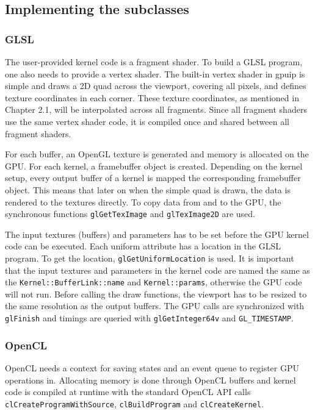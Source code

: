 \subsection{Implementing the subclasses}
\subsubsection{GLSL}
The user-provided kernel code is a fragment shader. To build a GLSL program, one also needs to provide a vertex shader. The built-in vertex shader in gpuip is simple and draws a 2D quad across the viewport, covering all pixels, and defines texture coordinates in each corner. These texture coordinates, as mentioned in Chapter 2.1, will be interpolated across all fragments. Since all fragment shaders use the same vertex shader code, it is compiled once and shared between all fragment shaders.
\newline

For each buffer, an OpenGL texture is generated and memory is allocated on the GPU. For each kernel, a framebuffer object is created. Depending on the kernel setup, every output buffer of a kernel is mapped the corresponding framebuffer object. This means that later on when the simple quad is drawn, the data is rendered to the textures directly. To copy data from and to the GPU, the synchronous functions {\tt glGetTexImage} and {\tt glTexImage2D} are used.
\newline

The input textures (buffers) and parameters has to be set before the GPU kernel code can be executed. Each uniform attribute has a location in the GLSL program. To get the location, {\tt glGetUniformLocation} is used. It is important that the input textures and parameters in the kernel code are named the same as the {\tt Kernel::BufferLink::name} and {\tt Kernel::params}, otherwise the GPU code will not run. Before calling the draw functions, the viewport has to be resized to the same resolution as the output buffers. The GPU calls are synchronized with {\tt glFinish} and timings are queried with {\tt glGetInteger64v} and {\tt GL\_TIMESTAMP}.

\subsubsection{OpenCL}

OpenCL needs a context for saving states and an event queue to register GPU operations in. Allocating memory is done through OpenCL buffers and kernel code is compiled at runtime with the standard OpenCL API calls {\tt clCreateProgramWithSource}, {\tt clBuildProgram} and {\tt clCreateKernel}.
\newline

